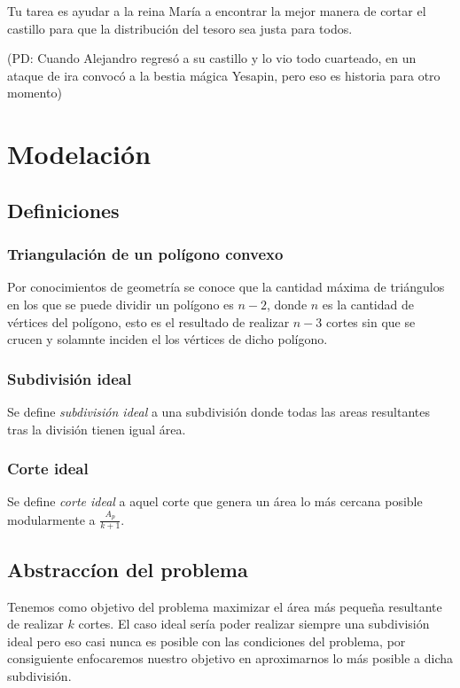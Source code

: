 \documentclass{article}
\begin{document}
Tu tarea es ayudar a la reina María a encontrar la mejor manera de cortar el castillo para que la distribución del tesoro sea justa para todos.

(PD: Cuando Alejandro regresó a su castillo y lo vio todo cuarteado, en un ataque de ira convocó a la bestia mágica Yesapin, pero eso es historia para otro momento)

\section{Modelaci\'{o}n}

\subsection{Definiciones}
\subsubsection{Triangulaci\'{o}n de un pol\'{i}gono convexo}


Por conocimientos de geometr\'{i}a se conoce que la cantidad m\'{a}xima de tri\'{a}ngulos en los que se puede dividir un pol\'{i}gono es $n-2$, donde $n$ es la cantidad de v\'{e}rtices del pol\'{i}gono, esto es el resultado de realizar $n-3$ cortes sin que se crucen y solamnte inciden el los v\'{e}rtices de dicho pol\'{i}gono.


\subsubsection{Subdivisi\'{o}n ideal}


Se define \textit{subdivisi\'{o}n ideal} a una subdivisi\'{o}n donde todas las areas resultantes tras la divisi\'{o}n tienen igual \'{a}rea.


\subsubsection{Corte ideal}


Se define \textit{corte ideal} a aquel corte que genera un \'{a}rea lo m\'{a}s cercana posible modularmente a $\frac{A_p}{k+1}$.


\subsection{Abstracc\'{i}on del problema}


Tenemos como objetivo del problema maximizar el \'{a}rea m\'{a}s peque\~{n}a resultante de realizar $k$ cortes. El caso ideal ser\'{i}a poder realizar siempre una subdivisi\'{o}n ideal pero eso casi nunca es posible con las condiciones del problema, por consiguiente enfocaremos nuestro objetivo en aproximarnos lo m\'{a}s posible a dicha subdivisi\'{o}n.
\end{document}
